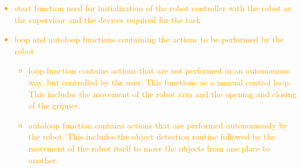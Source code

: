 \textcolor{orange}{
\begin{itemize}
    \item start function used for initialization of the robot controller with the robot as the supervisor and the devices required for the task
    \item loop and autoloop functions containing the actions to be performed by the robot
    \begin{itemize}
      \item loop function contains actions that are not performed in an autonomous way, but controlled by the user. This functions as a manual control loop. This includes the movement of the robot arm and the opening and closing of the gripper. 
      \item autoloop function contains actions that are performed autonomously by the robot. This includes the object detection routine followed by the movement of the robot itself to move the objects from one place to another.
    \end{itemize}
\end{itemize}
} %
